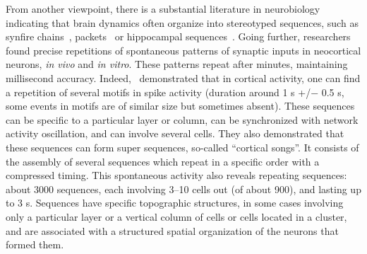 \documentclass[brainsci, %
               review,accept,pdftex,moreauthors
               ]{Definitions/mdpi}
\begin{document}
From another viewpoint, there is a substantial literature in neurobiology indicating that brain dynamics often organize into stereotyped sequences, such as synfire chains~\citep{ikegaya_synfire_2004}, packets~\citep{luczak_sequential_2007} or hippocampal sequences~\citep{pastalkova_internally_2008}. %
Going further, researchers found precise repetitions of spontaneous patterns of synaptic inputs in neocortical neurons, \emph{in vivo} %
 and \emph{in vitro}. These patterns repeat after minutes, maintaining millisecond accuracy. Indeed,~\citet{ikegaya_synfire_2004} demonstrated that in cortical activity, one can find a repetition of several motifs in spike activity (duration around 1 s +/$-$ 0.5 s, some events in motifs are of similar size but sometimes absent). These sequences can be specific to a particular layer or column, can be synchronized with network activity oscillation, and can involve several cells. They also demonstrated that these sequences can form super sequences, so-called ``cortical songs''. It consists of the assembly of several sequences which repeat in a specific order with a compressed timing. This spontaneous activity also reveals repeating sequences: about 3000 sequences, each involving 3--10 cells out (of about 900), and lasting up to 3 s. Sequences have specific topographic structures, in some cases involving only a particular layer or a vertical column of cells or cells located in a cluster, and are associated with a structured spatial organization of the neurons that formed them. %
\end{document}

